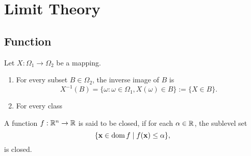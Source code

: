 \chapter{Limit Theory}

\section{Function}

\begin{definition}[Mapping]
	Let \(X:\Omega_1\rightarrow\Omega_2\) be a mapping.
	\begin{enumerate}
		\item
		      For every subset \(B\in\Omega_2\), the inverse image of \(B\) is
		      \begin{equation*}
			      X^{-1}(B)=\{\omega:\omega\in\Omega_1,X(\omega)\in B\}:=\{X\in B\}.
		      \end{equation*}
		\item
		      For every class
	\end{enumerate}
\end{definition}

\begin{definition}\label{def:closed-function}
	A function \(f:\mathbb{R}^{n}\rightarrow\mathbb{R}\) is said to be closed, if for each \(\alpha\in\mathbb{R}\), the sublevel set
	\begin{equation}
		\{\mathbf{x}\in\operatorname{dom}f\mid f(\mathbf{x})\leq\alpha\},
	\end{equation}
	is closed.
\end{definition}
